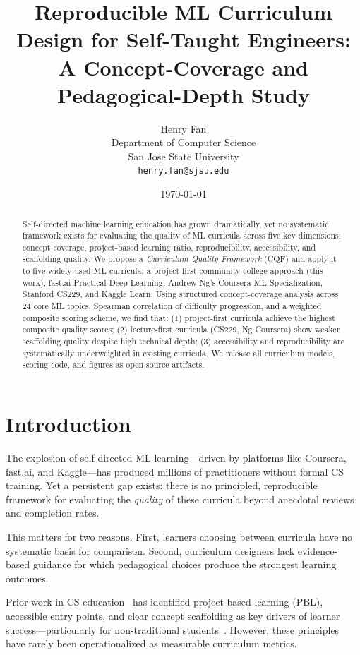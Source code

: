 \documentclass[10pt,twocolumn]{article}
\title{%
  \textbf{Reproducible ML Curriculum Design for Self-Taught Engineers:}\\
  A Concept-Coverage and Pedagogical-Depth Study
}
\author{%
  Henry Fan \\
  Department of Computer Science \\
  San Jose State University \\
  \texttt{henry.fan@sjsu.edu}
}
\date{\today}
\begin{document}
\maketitle

\begin{abstract}
Self-directed machine learning education has grown dramatically, yet no systematic 
framework exists for evaluating the quality of ML curricula across five key dimensions: 
concept coverage, project-based learning ratio, reproducibility, accessibility, and 
scaffolding quality.
We propose a \textit{Curriculum Quality Framework} (CQF) and apply it to five widely-used 
ML curricula: a project-first community college approach (this work), fast.ai Practical 
Deep Learning, Andrew Ng's Coursera ML Specialization, Stanford CS229, and Kaggle Learn.
Using structured concept-coverage analysis across 24 core ML topics, Spearman correlation 
of difficulty progression, and a weighted composite scoring scheme, we find that:
(1) project-first curricula achieve the highest composite quality scores;
(2) lecture-first curricula (CS229, Ng Coursera) show weaker scaffolding quality 
    despite high technical depth;
(3) accessibility and reproducibility are systematically underweighted in existing curricula.
We release all curriculum models, scoring code, and figures as open-source artifacts.
\end{abstract}

\section{Introduction}

The explosion of self-directed ML learning—driven by platforms like Coursera, fast.ai, 
and Kaggle—has produced millions of practitioners without formal CS training. 
Yet a persistent gap exists: there is no principled, reproducible framework for evaluating 
the \textit{quality} of these curricula beyond anecdotal reviews and completion rates.

This matters for two reasons. First, learners choosing between curricula have no 
systematic basis for comparison. Second, curriculum designers lack evidence-based 
guidance for which pedagogical choices produce the strongest learning outcomes.

Prior work in CS education~\citep{ko2020computing} has identified project-based learning 
(PBL), accessible entry points, and clear concept scaffolding as key drivers of learner 
success—particularly for non-traditional students~\citep{hooks1994teaching}. 
However, these principles have rarely been operationalized as measurable curriculum metrics.
\end{document}
